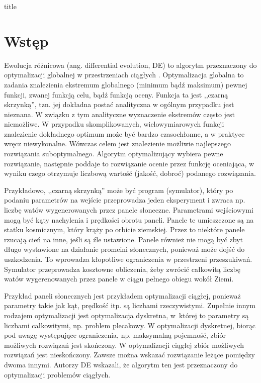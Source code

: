 \documentclass[a4paper,onecolumn,oneside,12pt,wide,floatssmall]{mwrep}
\theoremstyle{definition}
\theoremstyle{plain}%
\theoremstyle{remark}
\begin{document}
\renewcommand*\lstlistingname{Wydruk}
\renewcommand*\lstlistlistingname{Spis wydruków}

\renewcommand{\baselinestretch}{1.0}
\raggedbottom
 {title}

\tableofcontents

\newpage
{}
\setcounter{page}{1}

\chapter{Wstęp}

Ewolucja różnicowa (ang. differential evolution, DE) to algorytm przeznaczony do optymalizacji globalnej 
w przestrzeniach ciągłych \cite{storn}. Optymalizacja globalna to zadania znalezienia ekstremum 
globalnego (minimum bądź maksimum) pewnej funkcji, zwanej funkcją celu, bądź funkcją oceny. 
Funkcja ta jest ,,czarną skrzynką'', tzn. jej dokładna postać analityczna w ogólnym przypadku 
jest nieznana. W związku z tym analityczne wyznaczenie ekstremów często jest niemożliwe. W przypadku 
skomplikowanych, wielowymiarowych funkcji znalezienie dokładnego optimum może być bardzo czasochłonne, 
a w praktyce wręcz niewykonalne. Wówczas celem jest znalezienie możliwie najlepszego rozwiązania
suboptymalnego. Algorytm optymalizujący wybiera pewne rozwiązanie, następnie poddaje to rozwiązanie 
ocenie przez funkcję oceniająca, w wyniku czego otrzymuje liczbową wartość (jakość, dobroć) 
podanego rozwiązania. 

Przykładowo, ,,czarną skrzynką'' może być program (symulator), który po podaniu 
parametrów na wejście przeprowadza jeden eksperyment i zwraca np. liczbę watów wygenerowanych
przez panele słoneczne. Parametrami wejściowymi mogą być kąty nachylenia i prędkości obrotu paneli. 
Panele te umieszczone są na statku kosmicznym, który krąży po orbicie ziemskiej.
Przez to niektóre panele rzucają cień na inne, jeśli są źle ustawione. Panele również nie mogą być 
zbyt długo wystawione na działanie promeini słonecznych, ponieważ może dojść do uszkodzenia. 
To wprowadza kłopotliwe ograniczenia w przestrzeni przeszukiwań.
Symulator przeprowadza kosztowne obliczenia, żeby zwrócić całkowitą liczbę watów wygerenowanych
przez panele w ciągu pełnego obiegu wokół Ziemi. 

Przykład paneli słonecznych jest przykładem optymalizacji ciągłej, ponieważ parametry takie jak kąt,
prędkość itp. są liczbami rzeczywistymi. Zupełnie innym rodzajem optymalizacji jest optymalizacja 
dyskretna, w której to parametry są liczbami całkowitymi, np. problem plecakowy.
W optymalizacji dyskretnej, biorąc pod uwagę występujące ograniczenia,
np. maksymalną pojemność, zbiór możliwych rozwiązań jest skończony. 
W optymalizacji ciągłej zbiór możliwych rozwiązań jest nieskończony. Zawsze można wskazać rozwiązanie 
leżące pomiędzy dwoma innymi. Autorzy DE wskazali, że algorytm ten jest przeznaczony do 
optymalizacji problemów ciągłych. \cite{storn}
\end{document}
